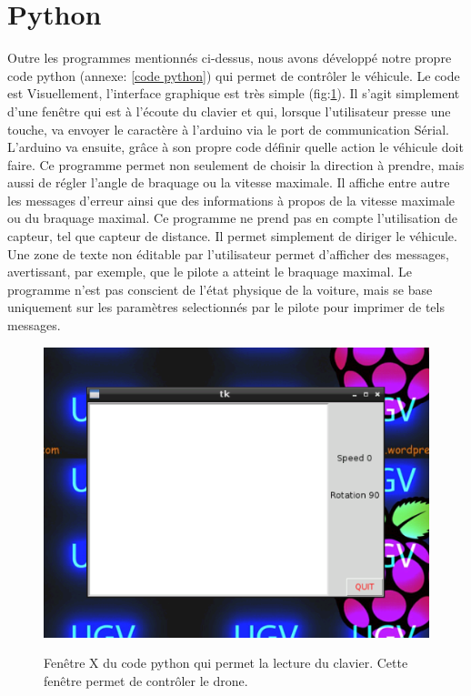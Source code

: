 \documentclass[a4paper,11pt]{report}
\begin{document}
{\section{Python}
Outre les programmes mentionnés ci-dessus, nous avons développé notre propre
code python (annexe: \ref{code python}) qui permet de contrôler le
véhicule. Le code est  Visuellement, l'interface graphique est très simple
(fig:\ref{python environnement}). Il s'agit simplement d'une fenêtre qui est à
l'écoute du clavier et qui, lorsque l'utilisateur presse une touche, va
envoyer le caractère à l'arduino via le port de communication
Sérial. L'arduino va ensuite, grâce à son propre code définir quelle action le
véhicule doit faire. Ce programme permet non seulement de choisir la direction
à prendre, mais aussi de régler l'angle de braquage ou la vitesse maximale. Il
affiche entre autre les messages d'erreur ainsi que des informations à propos
de la vitesse maximale ou du braquage maximal. Ce programme ne prend pas en
compte l'utilisation de capteur, tel que capteur de distance. Il permet
simplement de diriger le véhicule. Une zone de texte non éditable par
l'utilisateur permet d'afficher des messages, avertissant, par exemple, que le
pilote a atteint le braquage maximal. Le programme n'est pas conscient de
l'état physique de la voiture, mais se base uniquement sur les paramètres
selectionnés par le pilote pour imprimer de tels messages. 

\begin{center}
\begin{figure}[!h]
\includegraphics[scale=1]{python-environnement}\label{python environnement}
\caption{Fenêtre X du code python qui permet la lecture du clavier. Cette fenêtre permet de contrôler le drone.}
\end{figure}
\end{center}



}
\end{document}
